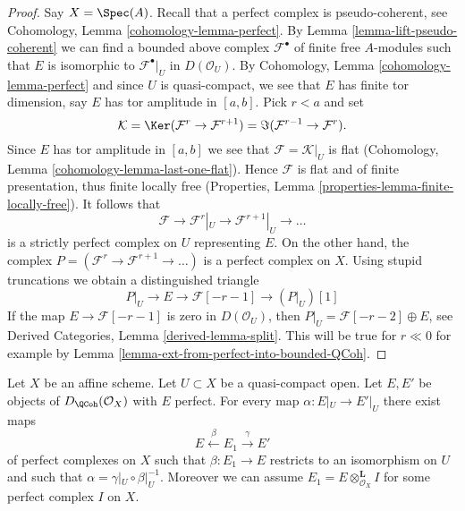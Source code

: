 \begin{proof}
Say $X = \Spec(A)$. Recall that a perfect complex is
pseudo-coherent, see
Cohomology, Lemma \ref{cohomology-lemma-perfect}.
By Lemma \ref{lemma-lift-pseudo-coherent} we can find a bounded above complex
$\mathcal{F}^\bullet$ of finite free $A$-modules such that $E$ is
isomorphic to $\mathcal{F}^\bullet|_U$ in $D(\mathcal{O}_U)$.
By Cohomology, Lemma \ref{cohomology-lemma-perfect} and since
$U$ is quasi-compact, we see that $E$ has finite tor dimension, say
$E$ has tor amplitude in $[a, b]$. Pick $r < a$ and set
$$
\mathcal{K} = \Ker(\mathcal{F}^{r} \to \mathcal{F}^{r + 1})
= \Im(\mathcal{F}^{r - 1} \to \mathcal{F}^r).
$$
Since $E$ has tor amplitude in $[a, b]$ we see that
$\mathcal{F} = \mathcal{K}|_U$ is
flat (Cohomology, Lemma \ref{cohomology-lemma-last-one-flat}).
Hence $\mathcal{F}$ is flat and of finite presentation, thus finite
locally free (Properties, Lemma \ref{properties-lemma-finite-locally-free}).
It follows that
$$
\mathcal{F} \to \mathcal{F}^r|_U \to \mathcal{F}^{r + 1}|_U \to \ldots
$$
is a strictly perfect complex on $U$ representing $E$. On the other hand,
the complex $P = (\mathcal{F}^r \to \mathcal{F}^{r + 1} \to \ldots )$
is a perfect complex on $X$. Using
stupid truncations we obtain a distinguished triangle
$$
P|_U \to E \to \mathcal{F}[-r - 1] \to (P|_U)[1]
$$
If the map $E \to \mathcal{F}[-r - 1]$ is zero in $D(\mathcal{O}_U)$,
then $P|_U = \mathcal{F}[-r - 2] \oplus E$, see
Derived Categories, Lemma \ref{derived-lemma-split}.
This will be true for $r \ll 0$ for example by
Lemma \ref{lemma-ext-from-perfect-into-bounded-QCoh}.
\end{proof}

\begin{lemma}
\label{lemma-lift-map}
Let $X$ be an affine scheme. Let $U \subset X$ be a quasi-compact open.
Let $E, E'$ be objects of $D_\QCoh(\mathcal{O}_X)$ with $E$ perfect.
For every map $\alpha : E|_U \to E'|_U$ there exist maps
$$
E \xleftarrow{\beta} E_1 \xrightarrow{\gamma} E'
$$
of perfect complexes on $X$ such that $\beta : E_1 \to E$ restricts to an
isomorphism on $U$ and such that $\alpha = \gamma|_U \circ \beta|_U^{-1}$.
Moreover we can assume $E_1 = E \otimes_{\mathcal{O}_X}^\mathbf{L} I$
for some perfect complex $I$ on $X$.
\end{lemma}

